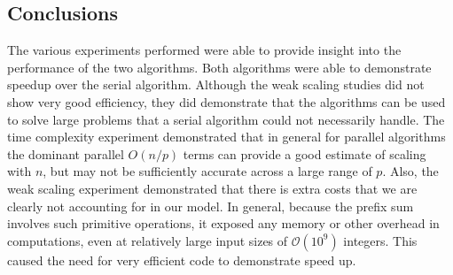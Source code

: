 \documentclass[12pt]{article}
\begin{document}
\begin{algorithm}
{{{{%

\section{Conclusions}

The various experiments performed were able to provide insight into the performance
of the two algorithms.  Both algorithms were able to demonstrate speedup
over the serial algorithm.  Although the weak scaling studies did not show very good efficiency,
they did demonstrate that the algorithms can be used to solve large problems that a
serial algorithm could not necessarily handle.  The time complexity experiment
demonstrated that in general for parallel algorithms the dominant parallel $O(n/p)$
terms can provide a good estimate of scaling with $n$, but may not be sufficiently
accurate across a large range of $p$. Also, the weak scaling experiment demonstrated that there is extra costs that we are
clearly not accounting for in our model. In general, because the prefix sum involves such primitive operations, it exposed any memory or
other overhead in computations, even at relatively large input sizes of
$\mathcal{O}(10^9)$ integers.  This caused the need for very efficient code to demonstrate speed
up. 

}}}}
\end{algorithm}
\end{document}
